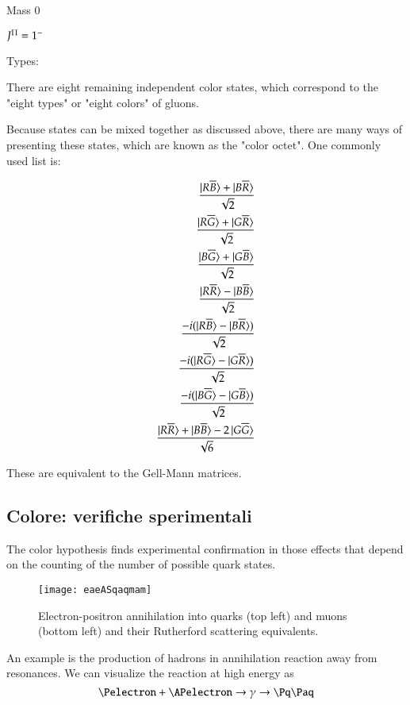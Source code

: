 \documentclass[main.tex]{subfiles}
\begin{document}
\begin{itemize*}
\item Mass 0
\item $J^{\Pi}=1^-$
\item Types:

There are eight remaining independent color states, which correspond to the "eight types" or "eight colors" of gluons.

Because states can be mixed together as discussed above, there are many ways of presenting these states, which are known as the "color octet". One commonly used list is:

\begin{align*}
\frac{\ket{R\overline{B}}+\ket{B\overline{R}}}{\sqrt{2}}\\
\frac{\ket{R\overline{G}}+\ket{G\overline{R}}}{\sqrt{2}}\\
\frac{\ket{B\overline{G}}+\ket{G\overline{B}}}{\sqrt{2}}\\
\frac{\ket{R\overline{R}}-\ket{B\overline{B}}}{\sqrt{2}}\\
\frac{-i(\ket{R\overline{B}}-\ket{B\overline{R}})}{\sqrt{2}}\\
\frac{-i(\ket{R\overline{G}}-\ket{G\overline{R}})}{\sqrt{2}}\\
\frac{-i(\ket{B\overline{G}}-\ket{G\overline{B}})}{\sqrt{2}}\\
\frac{\ket{R\overline{R}}+\ket{B\overline{B}}-2\ket{G\overline{G}}}{\sqrt{6}}
\end{align*}

These are equivalent to the Gell-Mann matrices.

\end{itemize*}


\subsection{Colore: verifiche sperimentali}
The color hypothesis finds experimental confirmation in those effects that depend on the counting of the number of possible quark states.

\begin{figure}[!ht]
\centering
\texttt{[image: eaeASqaqmam]}
\caption{Electron-positron annihilation into quarks (top left) and muons (bottom left) and their Rutherford scattering equivalents.}
\label{fig:eaeASqaqmam}
\end{figure}

An example is the production of hadrons in \Pelectron\APelectron annihilation reaction away from resonances. We can visualize the reaction at high energy as
\begin{equation*}
\Pelectron+\APelectron\rightarrow\gamma\rightarrow\Pq\Paq
\end{equation*}
\end{document}

